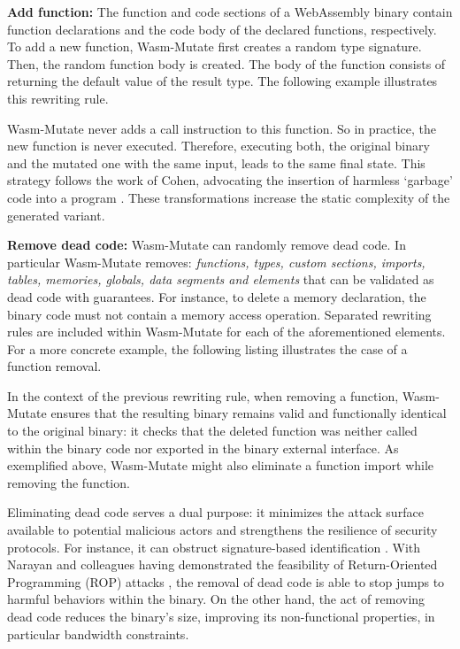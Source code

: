 \documentclass[a4paper,fleqn]{cas-dc}
\newcommand{\tool}{{\sc Wasm-Mutate}\xspace}
\begin{document}
\textbf{Add function:} The function and code sections of a WebAssembly binary contain function  declarations and the code body of the declared functions, respectively.
To add a new function, \tool first creates a random type signature.
Then, the random function body is created.
The body of the function consists of returning the default value of the result type.
The following example illustrates this rewriting rule.



\tool never adds a call instruction to this function.
So in practice, the new function is never executed.
Therefore, executing both, the original binary and the mutated one with the same input, leads to the same final state.
This strategy follows the work of Cohen, advocating the insertion of harmless `garbage' code into a program \cite{cohen1993operating}. 
These transformations increase the static complexity of the generated variant.

\textbf{Remove dead code:} \tool can randomly remove dead code.
In particular \tool removes: \emph{functions, types, custom sections, imports, tables, memories, globals, data segments and elements} that can be validated as dead code with guarantees.
For instance, to delete a memory declaration, the binary code must not contain a memory access operation. 
Separated rewriting rules are included within \tool for each of the aforementioned elements.
For a more concrete example, the following listing illustrates the case of a function removal.



In the context of the previous rewriting rule, when removing a function, \tool ensures that the resulting binary remains valid and functionally identical to the original binary: it checks  that the deleted function was neither called within the binary code nor exported in the binary external interface. 
As exemplified above, \tool might also eliminate a function import while removing the function. 

Eliminating dead code serves a dual purpose: it minimizes the attack surface available to potential malicious actors \cite{236200} and strengthens the resilience of security protocols. 
For instance, it can obstruct signature-based identification \cite{CABRERAARTEAGA2023103296}.
With Narayan and colleagues having demonstrated the feasibility of Return-Oriented Programming (ROP) attacks \cite{Swivel}, the removal of dead code is able to stop jumps to harmful behaviors within the binary. 
On the other hand, the act of removing dead code  reduces the binary's size, improving its non-functional properties, in particular bandwidth constraints. 
\end{document}
